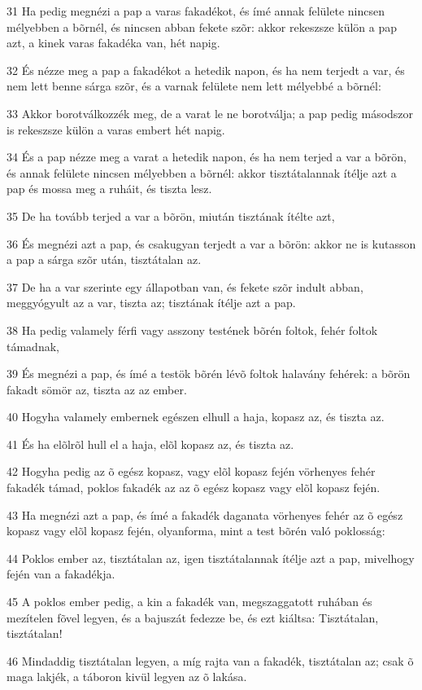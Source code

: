 \par 31 Ha pedig megnézi a pap a varas fakadékot, és ímé annak felülete nincsen mélyebben a bõrnél, és nincsen abban fekete szõr: akkor rekeszsze külön a pap azt, a kinek varas fakadéka van, hét napig.
\par 32 És nézze meg a pap a fakadékot a hetedik napon, és ha nem terjedt a var, és nem lett benne sárga szõr, és a varnak felülete nem lett mélyebbé a bõrnél:
\par 33 Akkor borotválkozzék meg, de a varat le ne borotválja; a pap pedig másodszor is rekeszsze külön a varas embert hét napig.
\par 34 És a pap nézze meg a varat a hetedik napon, és ha nem terjed a var a bõrön, és annak felülete nincsen mélyebben a bõrnél: akkor tisztátalannak ítélje azt a pap és mossa meg a ruháit, és tiszta lesz.
\par 35 De ha tovább terjed a var a bõrön, miután tisztának ítélte azt,
\par 36 És megnézi azt a pap, és csakugyan terjedt a var a bõrön: akkor ne is kutasson a pap a sárga szõr után, tisztátalan az.
\par 37 De ha a var szerinte egy állapotban van, és fekete szõr indult abban, meggyógyult az a var, tiszta az; tisztának ítélje azt a pap.
\par 38 Ha pedig valamely férfi vagy asszony testének bõrén foltok, fehér foltok támadnak,
\par 39 És megnézi a pap, és ímé a testök bõrén lévõ foltok halavány fehérek: a bõrön fakadt sömör az, tiszta az az ember.
\par 40 Hogyha valamely embernek egészen elhull a haja, kopasz az, és tiszta az.
\par 41 És ha elõlrõl hull el a haja, elõl kopasz az, és tiszta az.
\par 42 Hogyha pedig az õ egész kopasz, vagy elõl kopasz fején vörhenyes fehér fakadék támad, poklos fakadék az az õ egész kopasz vagy elõl kopasz fején.
\par 43 Ha megnézi azt a pap, és ímé a fakadék daganata vörhenyes fehér az õ egész kopasz vagy elõl kopasz fején, olyanforma, mint a test bõrén való poklosság:
\par 44 Poklos ember az, tisztátalan az, igen tisztátalannak ítélje azt a pap, mivelhogy fején van a fakadékja.
\par 45 A poklos ember pedig, a kin a fakadék van, megszaggatott ruhában és mezítelen fõvel legyen, és a bajuszát fedezze be, és ezt kiáltsa: Tisztátalan, tisztátalan!
\par 46 Mindaddig tisztátalan legyen, a míg rajta van a fakadék, tisztátalan az; csak õ maga lakjék, a táboron kivül legyen az õ lakása.
